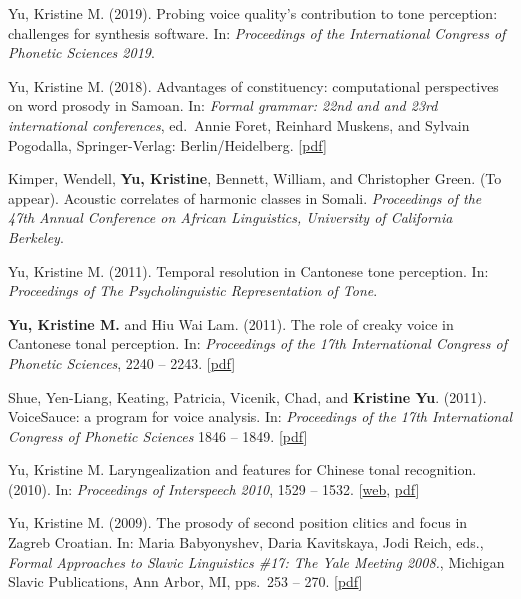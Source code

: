 \documentclass[10pt]{article}
\begin{document}
\begin{bibenum}

\item Yu, Kristine M. (2019). Probing voice quality's contribution to tone perception: challenges for synthesis software. In: \emph{Proceedings of the International Congress of Phonetic Sciences 2019}. 
  
\item Yu, Kristine M. (2018). Advantages of constituency: computational perspectives on word prosody in Samoan. In: \emph{Formal grammar: 22nd and and 23rd international conferences}, ed.\ Annie Foret, Reinhard Muskens, and Sylvain Pogodalla, Springer-Verlag: Berlin/Heidelberg. [\href{https://github.com/krismyu/smo-constituency-feet/blob/master/fg-kmyu.pdf}{pdf}]

  \item Kimper, Wendell, \textbf{Yu, Kristine}, Bennett, William, and Christopher Green. (To appear). Acoustic correlates of harmonic classes in
    Somali. \emph{Proceedings of the 47th Annual Conference on African Linguistics, University of California Berkeley}.
  
    \item Yu, Kristine M. (2011). Temporal resolution in {C}antonese tone
      perception. In: \emph{Proceedings of The Psycholinguistic Representation of Tone}.

    \item \textbf{Yu, Kristine M.} and Hiu Wai Lam. (2011). The role of creaky
      voice in {C}antonese tonal perception. In: \emph{Proceedings of the
        17th International Congress of Phonetic Sciences},
      2240 -- 2243. [\href{http://www.krisyu.org/pages/pdfs/yu-lam2011-icphs-cantonese-creak.pdf}{pdf}] 

    \item Shue, Yen-Liang, Keating, Patricia, Vicenik, Chad, and \textbf{Kristine
      Yu}. (2011). VoiceSauce: a program for voice analysis. In:
      \emph{Proceedings of the 17th International Congress of Phonetic
        Sciences}
      1846 -- 1849. [\href{http://www.krisyu.org/pages/pdfs/shueETAL2011-icphsxvii-voicesauce.pdf}{pdf}]

    \item Yu, Kristine M. Laryngealization and features for Chinese
      tonal recognition. (2010). In: \emph{Proceedings of Interspeech 2010},
      1529 --
      1532. [\href{http://www.isca-speech.org/archive/interspeech_2010/i10_1529.html}{web}, \href{http://www.krisyu.org/pages/pdfs/yu2010-interspeech-laryngealization.pdf}{pdf}]

    \item Yu, Kristine M. (2009). The prosody of second position
      clitics and focus in Zagreb Croatian. In: Maria Babyonyshev,
      Daria Kavitskaya, Jodi Reich, eds., \emph{Formal Approaches to Slavic Linguistics \#17: 
The Yale Meeting 2008.}, Michigan Slavic Publications, Ann Arbor, MI,
pps.\ 253 -- 270. [\href{http://www.krisyu.org/pages/pdfs/yu2009-fasl17-croatian-2pc.pdf}{pdf}]  

\end{bibenum}
\end{document}

